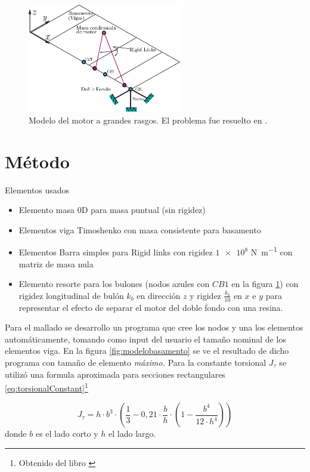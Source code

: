 \documentclass[onecolumn,10pt,titlepage,a4paper]{article}
\begin{document}
\begin{figure}[htb!]
	\centering
	\includegraphics[width=0.6\textwidth]{fig/modelomotor.eps}
	\caption{Modelo del motor a grandes rasgos. El problema fue resuelto en \Matlab.}
	\label{fig:modelomotor}
\end{figure}

\section{Método}

Elementos usados
\begin{itemize}
	\item Elemento masa 0D para masa puntual (sin rigidez)
	\item Elementos viga Timoshenko con masa consistente para basamento
	\item Elementos Barra simples para Rigid links con rigidez $\num{1e8}$ \si{\newton \per \meter} con matriz de masa nula
	\item Elemento resorte para los bulones (nodos azules con $CB1$ en la figura \ref{fig:modelomotor}) con rigidez longitudinal de bulón $k_b$ en dirección $z$ y rigidez $\frac{k_b}{10}$ en $x$ e $y$ para representar el efecto de separar el motor del doble fondo con una resina.
\end{itemize}

Para el mallado se desarrollo un programa que cree los nodos y una los elementos automáticamente, tomando como input del usuario el tamaño nominal de los elementos viga. En la figura \ref{fig:modelobasamento} se ve el resultado de dicho programa con tamaño de elemento \textit{máximo.} Para la constante torsional $J_\tau$ se utilizó una formula aproximada para secciones rectangulares \eqref{eq:torsionalConstant}\footnote{Obtenido del libro \cite{young2002roark}}

\begin{equation} \label{eq:torsionalConstant}
J_{\tau}=h \cdot b^{3} \cdot\left(\frac{1}{3}-0,21 \cdot \frac{b}{h} \cdot\left(1-\frac{b^{4}}{12 \cdot h^{4}}\right)\right)
\end{equation}
donde $b$ es el lado corto y $h$ el lado largo.
\end{document}
